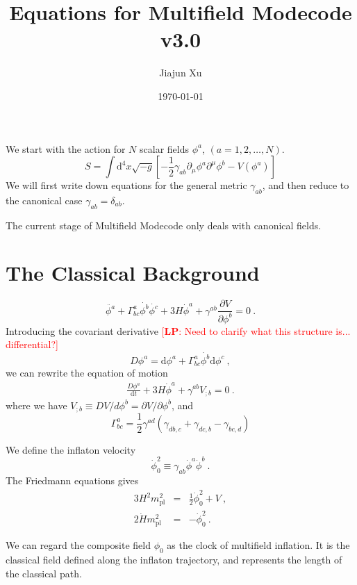 \documentclass[11pt]{article}
\title{Equations for Multifield Modecode v3.0}
\author{Jiajun Xu}
\date{\today}
\newcommand{\mpl}{m_{\mathrm{pl}}}
\newcommand{\ud}{\mathrm{d}}
\newcommand{\pd}{\partial}
\def\f {{\phi}}
\newcommand{\lp}[1]{\textcolor{red}{[{\bf LP}: #1]}}
\begin{document}
\maketitle

We start with the action for $N$ scalar fields $\phi^a$, $(a=1,2, \dots, N)$. 
\begin{equation}
S = \int \ud^4 x \sqrt{-g} \left[ -\frac{1}{2} \gamma_{ab} \pd_\mu \phi^a \pd^\mu \phi^b - V(\f^a) \right]
\end{equation}
We will first write down equations for the general metric $\gamma_{ab}$, and then reduce to the canonical case $\gamma_{ab} =\delta_{ab}$. 

The current stage of Multifield Modecode only deals with canonical fields. 

\section{The Classical Background}

\begin{equation}\label{bg_phi}
\ddot{\f^a} + \Gamma^a_{bc} \dot{\f^b} \dot{\f^c} + 3H \dot\f^a + \gamma^{ab} \frac{\pd V}{\pd \f^b} = 0  ~.
\end{equation}
Introducing the covariant derivative \lp{Need to clarify what this structure is... differential?}
\begin{equation}
D \f^a = \ud \f^a + \Gamma^a_{bc}\dot{\f^b}\ud\f^c ~,
\end{equation}
we can rewrite the equation of motion
\begin{eqnarray}
\frac{D\f^a}{\ud t} + 3H \dot\f^a + \gamma^{ab} V_{; b} = 0 ~. 
\end{eqnarray}
where we have $V_{;b} \equiv D V / d \f^b = \pd V/\pd \phi^b$, and
\[
\Gamma^a_{bc} = \frac{1}{2} \gamma^{ad}\left( \gamma_{db, c} + \gamma_{dc,b} - \gamma_{bc, d} \right)
\]

We define the inflaton velocity
\[
{\dot\f}_0^2 \equiv \gamma_{ab} {\dot\f}^a {\dot\f}^b ~. 
\]
The Friedmann equations gives
\begin{eqnarray}\label{fr_1}
3H^2\mpl^2 &=& \frac{1}{2} {\dot\f}_0^2 + V ~, \\ 
2\dot{H} \mpl^2 &=& - {\dot\f}_0^2 ~. \label{fr_2}
\end{eqnarray}

We can regard the composite field $\phi_0$ as the clock of multifield inflation. It is the classical field defined along the inflaton trajectory, and represents the length of the classical path.
\end{document}
